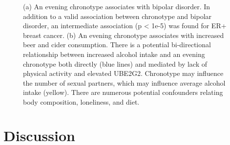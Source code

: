 \documentclass[journal,article,submit,moreauthors,pdftex]{Definitions/mdpi}
\begin{document}
\begin{figure}[htbp]
\begin{subfigure}{.65\linewidth}
\caption{}
\label{chronoBeer}
\end{subfigure}
\caption{(a) An evening chronotype associates with bipolar disorder. In addition to a valid association between chronotype and bipolar disorder, an intermediate association (p < 1e-5) was found for ER+ breast cancer. (b) An evening chronotype associates with increased beer and cider consumption. There is a potential bi-directional relationship between increased alcohol intake and an evening chronotype both directly (blue lines) and mediated by lack of physical activity and elevated UBE2G2. Chronotype may influence the number of sexual partners, which may influence average alcohol intake (yellow). There are numerous potential confounders relating body composition, loneliness, and diet.}
\label{chronoBeerBipolar}
\end{figure}




\section{Discussion}
\end{document}
